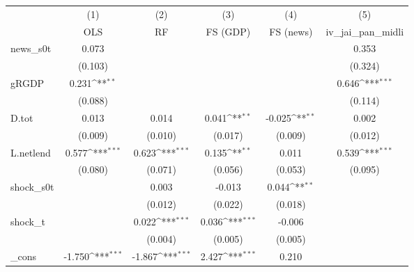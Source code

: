 {
\def\sym#1{\ifmmode^{#1}\else\(^{#1}\)\fi}
\begin{tabular}{l*{5}{c}}
\toprule
            &\multicolumn{1}{c}{(1)}&\multicolumn{1}{c}{(2)}&\multicolumn{1}{c}{(3)}&\multicolumn{1}{c}{(4)}&\multicolumn{1}{c}{(5)}\\
            &\multicolumn{1}{c}{OLS}&\multicolumn{1}{c}{RF}&\multicolumn{1}{c}{FS (GDP)}&\multicolumn{1}{c}{FS (news)}&\multicolumn{1}{c}{iv\_jai\_pan\_midli}\\
\midrule
news\_s0t    &       0.073         &                     &                     &                     &       0.353         \\
            &     (0.103)         &                     &                     &                     &     (0.324)         \\
\addlinespace
gRGDP       &       0.231\sym{**} &                     &                     &                     &       0.646\sym{***}\\
            &     (0.088)         &                     &                     &                     &     (0.114)         \\
\addlinespace
D.tot       &       0.013         &       0.014         &       0.041\sym{**} &      -0.025\sym{**} &       0.002         \\
            &     (0.009)         &     (0.010)         &     (0.017)         &     (0.009)         &     (0.012)         \\
\addlinespace
L.netlend   &       0.577\sym{***}&       0.623\sym{***}&       0.135\sym{**} &       0.011         &       0.539\sym{***}\\
            &     (0.080)         &     (0.071)         &     (0.056)         &     (0.053)         &     (0.095)         \\
\addlinespace
shock\_s0t   &                     &       0.003         &      -0.013         &       0.044\sym{**} &                     \\
            &                     &     (0.012)         &     (0.022)         &     (0.018)         &                     \\
\addlinespace
shock\_t     &                     &       0.022\sym{***}&       0.036\sym{***}&      -0.006         &                     \\
            &                     &     (0.004)         &     (0.005)         &     (0.005)         &                     \\
\addlinespace
\_cons      &      -1.750\sym{***}&      -1.867\sym{***}&       2.427\sym{***}&       0.210         &                     \\

\end{tabular}}
